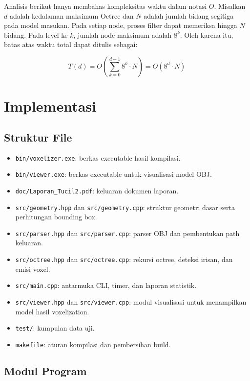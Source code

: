 \documentclass{article}
\begin{document}
Analisis berikut hanya membahas kompleksitas waktu dalam notasi $O$. Misalkan $d$ adalah kedalaman maksimum Octree dan $N$ adalah jumlah bidang segitiga pada model
masukan. Pada setiap node, proses filter dapat memeriksa hingga $N$ bidang. Pada level ke-$k$,
jumlah node maksimum adalah $8^k$. Oleh karena itu, batas atas waktu total dapat ditulis sebagai:

\[
T(d) = O\left(\sum_{k=0}^{d-1} 8^k \cdot N\right) = O(8^d \cdot N)
\]

\section{Implementasi}

\subsection{Struktur File}

\begin{itemize}
    \item \texttt{bin/voxelizer.exe}: berkas executable hasil kompilasi.
    \item \texttt{bin/viewer.exe}: berkas executable untuk visualisasi model OBJ.
    \item \texttt{doc/Laporan\_Tucil2.pdf}: keluaran dokumen laporan.
    \item \texttt{src/geometry.hpp} dan \texttt{src/geometry.cpp}: struktur geometri dasar serta perhitungan bounding box.
    \item \texttt{src/parser.hpp} dan \texttt{src/parser.cpp}: parser OBJ dan pembentukan path keluaran.
    \item \texttt{src/octree.hpp} dan \texttt{src/octree.cpp}: rekursi octree, deteksi irisan, dan emisi voxel.
    \item \texttt{src/main.cpp}: antarmuka CLI, timer, dan laporan statistik.
    \item \texttt{src/viewer.hpp} dan \texttt{src/viewer.cpp}: modul visualisasi untuk menampilkan model hasil voxelization.
    \item \texttt{test/}: kumpulan data uji.
    \item \texttt{makefile}: aturan kompilasi dan pembersihan build.
\end{itemize}

\subsection{Modul Program}
\end{document}
